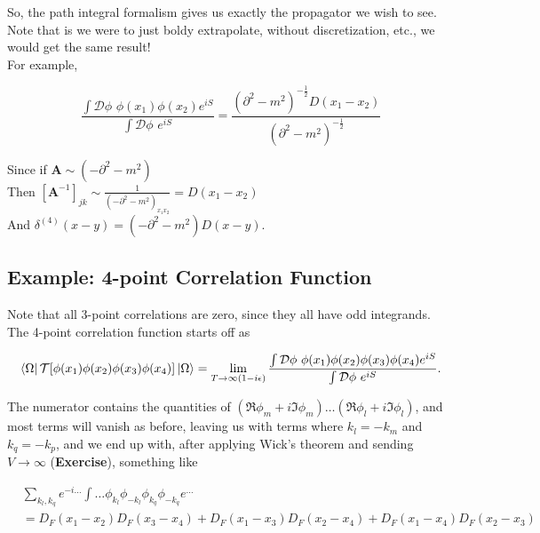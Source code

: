 \noindent So, the path integral formalism gives us exactly the propagator we wish to see. Note that is we were to just boldy extrapolate, without discretization, etc., we would get the same result! \\

\noindent For example,

\begin{equation}
\frac{\int \mathcal{D} \phi \,\, \phi(x_1) \phi(x_2) e^{i S}}{\int \mathcal{D} \phi \,\, e^{i S}} = \frac{(\partial^2 - m^2)^{-\frac{1}{2}} D(x_1 - x_2)}{(\partial^2 - m^2)^{-\frac{1}{2}}}
\end{equation}

\noindent Since if $\textbf{A} \sim (-\partial^2 - m^2)$ \\
Then $[ \textbf{A}^{-1}]_{jk} \sim \frac{1}{(-\partial^2 - m^2)_{x_1 x_2}} = D(x_1 - x_2)$ \\
And  $\delta^{(4)} (x-y) = (-\partial^2 - m^2) D(x-y)$. \\

\subsection*{Example: 4-point Correlation Function}

\noindent Note that all 3-point correlations are zero, since they all have odd integrands. The 4-point correlation function starts off as

\begin{equation}
\bra{\Omega} \mathcal{T} [ \phi (x_1) \phi (x_2) \phi (x_3) \phi (x_4) ] \ket{\Omega} = \lim_{T \rightarrow \infty (1 - i \epsilon)} \frac{\int \mathcal{D} \phi \,\, \phi(x_1) \phi(x_2) \phi(x_3) \phi(x_4) e^{i S}}{\int \mathcal{D} \phi \,\, e^{i S}}.
\end{equation}

\noindent The numerator contains the quantities of $(\Re \phi_m + i \Im \phi_m) \dots (\Re \phi_l + i \Im \phi_l)$, and most terms will vanish as before, leaving us with terms where $k_l = -k_m$ and $k_q = -k_p$, and we end up with, after applying Wick's theorem and sending $V \rightarrow \infty$ (\textbf{Exercise}), something like

\begin{align*}
&\sum_{k_l, k_q} e^{-i \dots} \int \dots \phi_{k_l} \phi_{-k_l} \phi_{k_q} \phi_{-k_q} e^{\dots} \\
&= D_F(x_1 - x_2) D_F (x_3 - x_4) + D_F (x_1 - x_3) D_F (x_2 - x_4) + D_F (x_1 - x_4) D_F (x_2 - x_3)
\end{align*}


